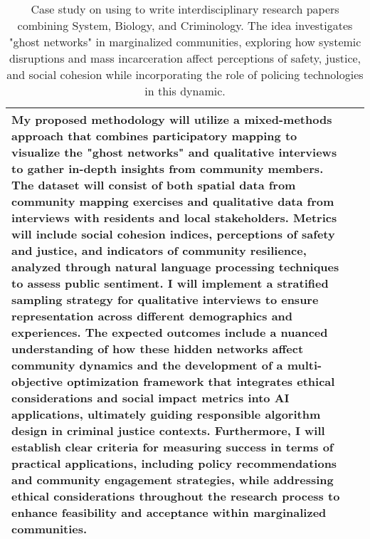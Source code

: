 \begin{table*}[htbp]
\begin{tabular}{p{3.5cm}p{12cm}}
My proposed methodology will utilize a mixed-methods approach that combines participatory mapping to visualize the "ghost networks" and qualitative interviews to gather in-depth insights from community members. The dataset will consist of both spatial data from community mapping exercises and qualitative data from interviews with residents and local stakeholders. Metrics will include social cohesion indices, perceptions of safety and justice, and indicators of community resilience, analyzed through natural language processing techniques to assess public sentiment. I will implement a stratified sampling strategy for qualitative interviews to ensure representation across different demographics and experiences. The expected outcomes include a nuanced understanding of how these hidden networks affect community dynamics and the development of a multi-objective optimization framework that integrates ethical considerations and social impact metrics into AI applications, ultimately guiding responsible algorithm design in criminal justice contexts. Furthermore, I will establish clear criteria for measuring success in terms of practical applications, including policy recommendations and community engagement strategies, while addressing ethical considerations throughout the research process to enhance feasibility and acceptance within marginalized communities.\\ 
\bottomrule[1.1pt]
\end{tabular}
\caption{Case study on using \envname to write interdisciplinary research papers combining System, Biology, and Criminology. The idea investigates "ghost networks" in marginalized communities, exploring how systemic disruptions and mass incarceration affect perceptions of safety, justice, and social cohesion while incorporating the role of policing technologies in this dynamic.}
\label{tab:System+Biology+Criminology}
\end{table*}


